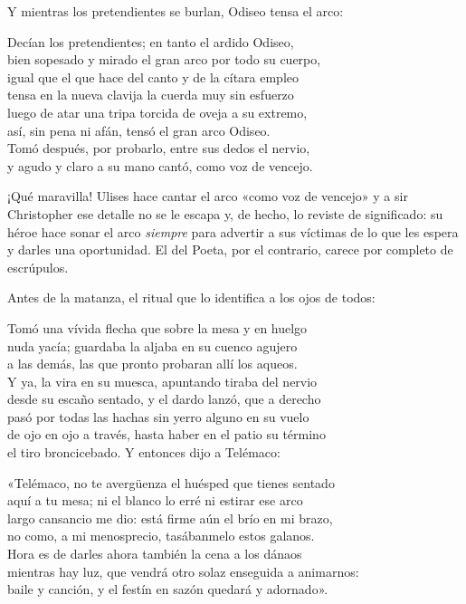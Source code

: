 Y mientras los pretendientes se burlan, Odiseo tensa el arco:

\begin{versocita}
Decían los pretendientes; en tanto el ardido Odiseo,\\
bien sopesado y mirado el gran arco por todo su cuerpo,\\
igual que el que hace del canto y de la cítara empleo\\
tensa en la nueva clavija la cuerda muy sin esfuerzo\\
luego de atar una tripa torcida de oveja a su extremo,\\
así, sin pena ni afán, tensó el gran arco Odiseo.\\
Tomó después, por probarlo, entre sus dedos el nervio,\\
y agudo y claro a su mano cantó, como voz de vencejo.
\end{versocita}

¡Qué maravilla! Ulises hace cantar el arco «como voz de vencejo» y a sir Christopher ese detalle no se le escapa y, de hecho, lo reviste de significado: su héroe hace sonar el arco \emph{siempre} para advertir a sus víctimas de lo que les espera y darles una oportunidad. El del Poeta, por el contrario, carece por completo de escrúpulos.

Antes de la matanza, el ritual que lo identifica a los ojos de todos:

\begin{versocita}
Tomó una vívida flecha que sobre la mesa y en huelgo\\
nuda yacía; guardaba la aljaba en su cuenco agujero\\
a las demás, las que pronto probaran allí los aqueos.\\
Y ya, la vira en su muesca, apuntando tiraba del nervio\\
desde su escaño sentado, y el dardo lanzó, que a derecho\\
pasó por todas las hachas sin yerro alguno en su vuelo\\
de ojo en ojo a través, hasta haber en el patio su término\\
el tiro broncicebado. Y entonces dijo a Telémaco:
\end{versocita}

\begin{versocita}
«Telémaco, no te avergüenza el huésped que tienes sentado\\
aquí a tu mesa; ni el blanco lo erré ni estirar ese arco\\
largo cansancio me dio: está firme aún el brío en mi brazo,\\
no como, a mi menosprecio, tasábanmelo estos galanos.\\
Hora es de darles ahora también la cena a los dánaos\\
mientras hay luz, que vendrá otro solaz enseguida a animarnos:\\
baile y canción, y el festín en sazón quedará y adornado».
\end{versocita}

